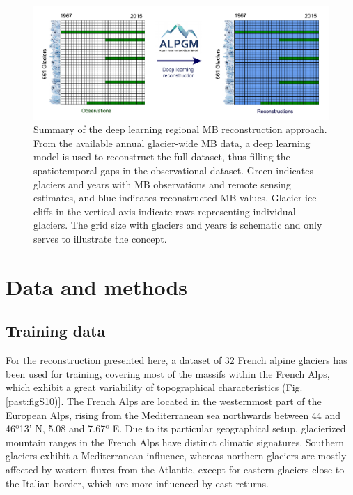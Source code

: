\begin{figure}[t]
\centering
\includegraphics[width=15cm]{Figures/past/Figure_1.pdf}
\captionsetup{justification=centering}
\caption{Summary of the deep learning regional MB reconstruction approach. From the available annual glacier-wide MB data, a deep learning model is used to reconstruct the full dataset, thus filling the spatiotemporal gaps in the observational dataset. Green indicates glaciers and years with MB observations and remote sensing estimates, and blue indicates reconstructed MB values. Glacier ice cliffs in the vertical axis indicate rows representing individual glaciers. The grid size with glaciers and years is schematic and only serves to illustrate the concept.}
\label{past:fig1}
\end{figure}


\section{Data and methods} \label{past:methods}

\subsection{Training data} \label{past:methods:data}

For the reconstruction presented here, a dataset of 32 French alpine glaciers has been used for training, covering most of the massifs within the French Alps, which exhibit a great variability of topographical characteristics (Fig. \ref{past:figS10)}. The French Alps are located in the westernmost part of the European Alps, rising from the Mediterranean sea northwards between 44 and 46º13' N, 5.08 and 7.67º E. Due to its particular geographical setup, glacierized mountain ranges in the French Alps have distinct climatic signatures. Southern glaciers exhibit a Mediterranean influence, whereas northern glaciers are mostly affected by western fluxes from the Atlantic, except for eastern glaciers close to the Italian border, which are more influenced by east returns. 

